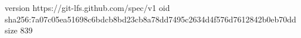 version https://git-lfs.github.com/spec/v1
oid sha256:7a07c05ea51698c6bdcb8bd23cb8a78dd7495c2634d4f576d7612842b0eb70dd
size 839
